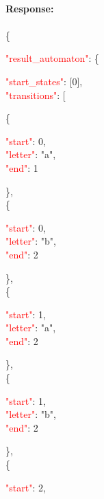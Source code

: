 \ \\
\textbf{Response:}\\
\ \\
 \{
 \begin{adjustwidth}{7.5 mm}{0 cm}
    \textcolor{red}{"result\_automaton"}: \{
        \begin{adjustwidth}{7.5 mm}{0 cm}
            \textcolor{red}{"start\_states"}: [0],\\
            \textcolor{red}{"transitions"}: [
            \begin{adjustwidth}{7.5 mm}{0 cm}
            \{
               \begin{adjustwidth}{7.5 mm}{0 cm}
                    \textcolor{red}{"start"}: 0,\\
                    \textcolor{red}{"letter"}: "a",\\
                    \textcolor{red}{"end"}: 1
               \end{adjustwidth}
            \},\\
            \{
            \begin{adjustwidth}{7.5 mm}{0 cm}
                    \textcolor{red}{"start"}: 0,\\
                    \textcolor{red}{"letter"}: "b",\\
                    \textcolor{red}{"end"}: 2
               \end{adjustwidth}
            \},\\
            \{
            \begin{adjustwidth}{7.5 mm}{0 cm}
                    \textcolor{red}{"start"}: 1,\\
                    \textcolor{red}{"letter"}: "a",\\
                    \textcolor{red}{"end"}: 2
               \end{adjustwidth}
            \},\\
            \{
            \begin{adjustwidth}{7.5 mm}{0 cm}
                    \textcolor{red}{"start"}: 1,\\
                    \textcolor{red}{"letter"}: "b",\\
                    \textcolor{red}{"end"}: 2
               \end{adjustwidth}
            \},\\
            \{
            \begin{adjustwidth}{7.5 mm}{0 cm}
                    \textcolor{red}{"start"}: 2,\\

\end{adjustwidth}
\end{adjustwidth}
\end{adjustwidth}
\end{adjustwidth}
